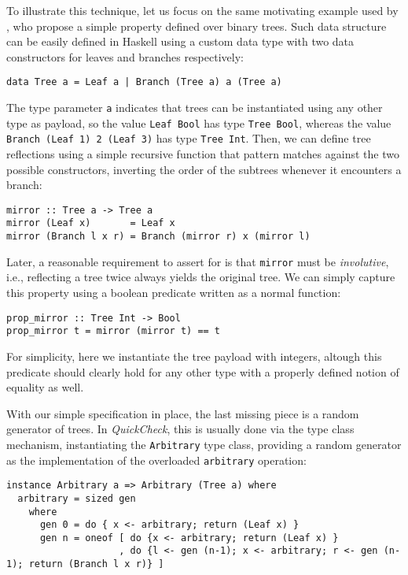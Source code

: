 \documentclass[acmsmall, anonymous]{acmart}
\newcommand{\quickcheck}{\textit{QuickCheck}\xspace}
\begin{document}
To illustrate this technique, let us focus on the same motivating example used
by \citeauthor{lampropoulos2019coverage}, who propose a simple property defined over
binary trees.
%
Such data structure can be easily defined in Haskell using a custom data type
with two data constructors for leaves and branches respectively:

\begin{verbatim}
data Tree a = Leaf a | Branch (Tree a) a (Tree a)
\end{verbatim}

\noindent The type parameter \texttt{a} indicates that trees can be instantiated
using any other type as payload, so the value \texttt{Leaf Bool} has type
\texttt{Tree Bool}, whereas the value \texttt{Branch (Leaf 1) 2 (Leaf 3)} has
type \texttt{Tree Int}.
%
Then, we can define tree reflections using a simple recursive function that
pattern matches against the two possible constructors, inverting the order of
the subtrees whenever it encounters a branch:

\begin{verbatim}
mirror :: Tree a -> Tree a
mirror (Leaf x)       = Leaf x
mirror (Branch l x r) = Branch (mirror r) x (mirror l)
\end{verbatim}

Later, a reasonable requirement to assert for is that \texttt{mirror} must be
\emph{involutive}, i.e., reflecting a tree twice always yields the original
tree.
%
We can simply capture this property using a boolean predicate written as a
normal function:

\begin{verbatim}
prop_mirror :: Tree Int -> Bool
prop_mirror t = mirror (mirror t) == t
\end{verbatim}

\noindent For simplicity, here we instantiate the tree payload with integers,
altough this predicate should clearly hold for any other type with a properly
defined notion of equality as well.


With our simple specification in place, the last missing piece is a random
generator of trees.
%
In \quickcheck, this is usually done via the type class mechanism, instantiating
the \texttt{Arbitrary} type class, providing a random generator as the
implementation of the overloaded \texttt{arbitrary} operation:

\begin{verbatim}
instance Arbitrary a => Arbitrary (Tree a) where
  arbitrary = sized gen
    where
      gen 0 = do { x <- arbitrary; return (Leaf x) }
      gen n = oneof [ do {x <- arbitrary; return (Leaf x) }
                    , do {l <- gen (n-1); x <- arbitrary; r <- gen (n-1); return (Branch l x r)} ]
\end{verbatim}
\end{document}
